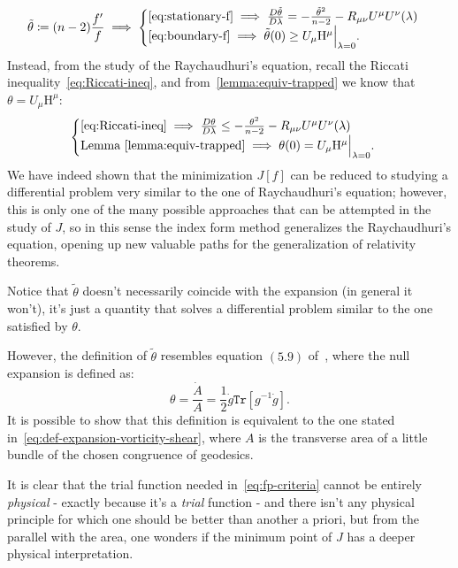 \[
\tilde{\theta}\coloneqq (n - 2) \frac{f'}{f} \implies
\begin{cases}
\eqref{eq:stationary-f} \implies \frac{D\tilde{\theta}}{D\lambda} = -\frac{\tilde{\theta}^2}{n - 2} - R_{\mu\nu}U^{\mu}U^{\nu}(\lambda) \\
\eqref{eq:boundary-f} \implies \tilde{\theta}(0) \ge U_{\mu}\mathrm{H}^{\mu}\Big\vert_{\lambda = 0}.
\end{cases}	
\]
Instead, from the study of the Raychaudhuri's equation, recall the Riccati inequality~\eqref{eq:Riccati-ineq}, and from~\ref{lemma:equiv-trapped} we know that \(\theta = U_{\mu}\mathrm{H}^{\mu}\):
\[
\begin{cases}
\eqref{eq:Riccati-ineq} \implies \frac{D\theta}{D\lambda} \le -\frac{\theta^2}{n - 2} - R_{\mu\nu}U^{\mu}U^{\nu}(\lambda) \\
\text{Lemma }\ref{lemma:equiv-trapped} \implies \theta(0) = U_{\mu}\mathrm{H}^{\mu}\Big\vert_{\lambda = 0}.
\end{cases}	
\]
We have indeed shown that the minimization \(J[f]\) can be reduced to studying a differential problem very similar to the one of Raychaudhuri's equation; however, this is only one of the many possible approaches that can be attempted in the study of \(J\), so in this sense the index form method generalizes the Raychaudhuri's equation, opening up new valuable paths for the generalization of relativity theorems.

\begin{remark}
	Notice that \(\tilde{\theta}\) doesn't necessarily coincide with the expansion (in general it won't), it's just a quantity that solves a differential problem similar to the one satisfied by \(\theta\). 
		
	However, the definition of \(\tilde{\theta}\) resembles equation \((5.9)\) of~\cite{witten2020light}, where the null expansion is defined as:
	\[
	\theta = \frac{\dot{A}}{A} = \frac{1}{2}\dot{g}\texttt{Tr}\left[g^{-1}\dot{g}\right].
	\]
	It is possible to show that this definition is equivalent to the one stated in~\eqref{eq:def-expansion-vorticity-shear}, where \(A\) is the transverse area of a little bundle of the chosen congruence of geodesics.
		
	It is clear that the trial function needed in~\ref{eq:fp-criteria} cannot be entirely \emph{physical} - exactly because it's a \emph{trial} function - and there isn't any physical principle for which one should be better than another a priori, but from the parallel with the area, one wonders if the minimum point of \(J\) has a deeper physical interpretation.
\end{remark}

